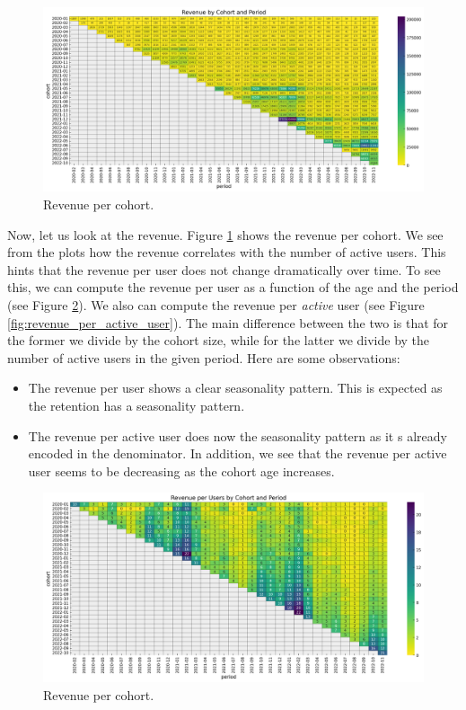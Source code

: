 \documentclass[11pt]{amsart}
\begin{document}
\begin{figure}
    \centering
    \includegraphics[width=\textwidth]{images/revenue_retention_23_0.png}
    \caption{Revenue per cohort.}
    \label{fig:revenue}
\end{figure}

Now, let us look at the revenue. Figure \ref{fig:revenue} shows the revenue per cohort. 
We see from the plots how the revenue correlates with the number of active users. This 
hints that the revenue per user does not change dramatically over time. To see this,
we can compute the revenue per user as a function of the age and the period (see Figure
\ref{fig:revenue_per_user}). We also can compute the revenue per {\em active} user (see
Figure \ref{fig:revenue_per_active_user}). The main difference between the two is that
for the former we divide by the cohort size, while for the latter we divide by the
number of active users in the given period. Here are some observations:

\begin{itemize}
    \item The revenue per user shows a clear seasonality pattern. This is expected as
        the retention has a seasonality pattern.
    \item The revenue per active user does now the seasonality pattern as it s already
        encoded in the denominator. In addition, we see that the revenue per active user
        seems to be decreasing as the cohort age increases.
\end{itemize}

\begin{figure}
    \centering
    \includegraphics[width=\textwidth]{images/revenue_retention_27_0.png}
    \caption{Revenue per cohort.}
    \label{fig:revenue_per_user}
\end{figure}
\end{document}
